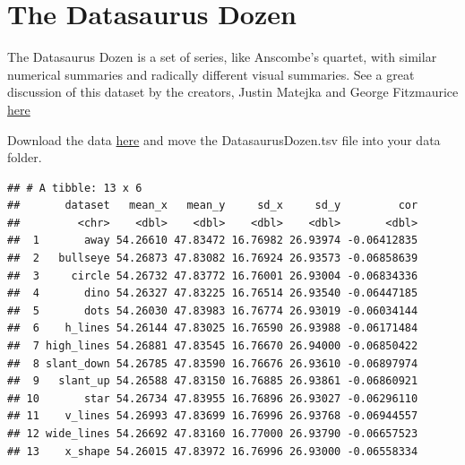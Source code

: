 \documentclass[]{book}
\newenvironment{Shaded}{\begin{snugshade}}{\end{snugshade}}
\newcommand{\KeywordTok}[1]{\textcolor[rgb]{0.13,0.29,0.53}{\textbf{{#1}}}}
\newcommand{\DataTypeTok}[1]{\textcolor[rgb]{0.13,0.29,0.53}{{#1}}}
\newcommand{\StringTok}[1]{\textcolor[rgb]{0.31,0.60,0.02}{{#1}}}
\newcommand{\NormalTok}[1]{{#1}}
\theoremstyle{definition}
\theoremstyle{definition}
\theoremstyle{remark}
\begin{document}
\section*{The Datasaurus Dozen}\label{the-datasaurus-dozen}

The Datasaurus Dozen is a set of series, like Anscombe's quartet, with
similar numerical summaries and radically different visual summaries.
See a great discussion of this dataset by the creators, Justin Matejka
and George Fitzmaurice
\href{https://www.autodeskresearch.com/publications/samestats}{here}

Download the data
\href{https://www.autodeskresearch.com/sites/default/files/The\%20Datasaurus\%20Dozen.zip}{here}
and move the DatasaurusDozen.tsv file into your data folder.

\begin{Shaded}
\end{Shaded}

\begin{verbatim}
## # A tibble: 13 x 6
##       dataset   mean_x   mean_y     sd_x     sd_y         cor
##         <chr>    <dbl>    <dbl>    <dbl>    <dbl>       <dbl>
##  1       away 54.26610 47.83472 16.76982 26.93974 -0.06412835
##  2   bullseye 54.26873 47.83082 16.76924 26.93573 -0.06858639
##  3     circle 54.26732 47.83772 16.76001 26.93004 -0.06834336
##  4       dino 54.26327 47.83225 16.76514 26.93540 -0.06447185
##  5       dots 54.26030 47.83983 16.76774 26.93019 -0.06034144
##  6    h_lines 54.26144 47.83025 16.76590 26.93988 -0.06171484
##  7 high_lines 54.26881 47.83545 16.76670 26.94000 -0.06850422
##  8 slant_down 54.26785 47.83590 16.76676 26.93610 -0.06897974
##  9   slant_up 54.26588 47.83150 16.76885 26.93861 -0.06860921
## 10       star 54.26734 47.83955 16.76896 26.93027 -0.06296110
## 11    v_lines 54.26993 47.83699 16.76996 26.93768 -0.06944557
## 12 wide_lines 54.26692 47.83160 16.77000 26.93790 -0.06657523
## 13    x_shape 54.26015 47.83972 16.76996 26.93000 -0.06558334
\end{verbatim}
\end{document}
